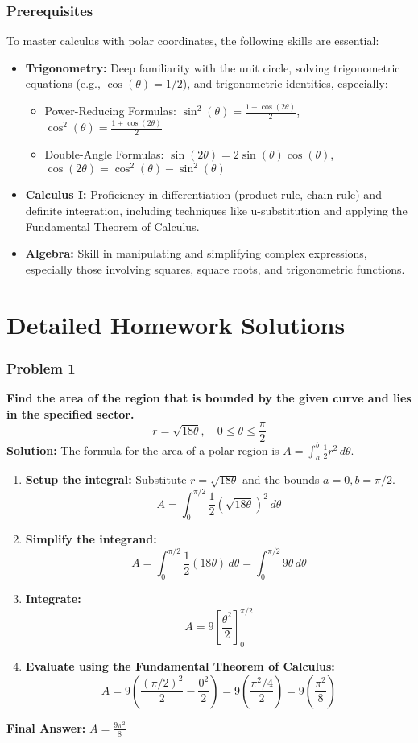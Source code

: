\documentclass{article}
\begin{document}
\section{Prerequisites}
To master calculus with polar coordinates, the following skills are essential:
\begin{itemize}
    \item \textbf{Trigonometry:} Deep familiarity with the unit circle, solving trigonometric equations (e.g., $\cos(\theta) = 1/2$), and trigonometric identities, especially:
    \begin{itemize}
        \item Power-Reducing Formulas: $\sin^2(\theta) = \frac{1 - \cos(2\theta)}{2}$, $\cos^2(\theta) = \frac{1 + \cos(2\theta)}{2}$
        \item Double-Angle Formulas: $\sin(2\theta) = 2\sin(\theta)\cos(\theta)$, $\cos(2\theta) = \cos^2(\theta) - \sin^2(\theta)$
    \end{itemize}
    \item \textbf{Calculus I:} Proficiency in differentiation (product rule, chain rule) and definite integration, including techniques like u-substitution and applying the Fundamental Theorem of Calculus.
    \item \textbf{Algebra:} Skill in manipulating and simplifying complex expressions, especially those involving squares, square roots, and trigonometric functions.
\end{itemize}

\part{Detailed Homework Solutions}
\newpage
\section*{Problem 1}
\textbf{Find the area of the region that is bounded by the given curve and lies in the specified sector.}
\[ r = \sqrt{18\theta}, \quad 0 \le \theta \le \frac{\pi}{2} \]
\textbf{Solution:}
The formula for the area of a polar region is $A = \int_{a}^{b} \frac{1}{2} r^2 \,d\theta$.
\begin{enumerate}
    \item \textbf{Setup the integral:}
    Substitute $r = \sqrt{18\theta}$ and the bounds $a=0, b=\pi/2$.
    \[ A = \int_{0}^{\pi/2} \frac{1}{2} (\sqrt{18\theta})^2 \,d\theta \]
    \item \textbf{Simplify the integrand:}
    \[ A = \int_{0}^{\pi/2} \frac{1}{2} (18\theta) \,d\theta = \int_{0}^{\pi/2} 9\theta \,d\theta \]
    \item \textbf{Integrate:}
    \[ A = 9 \left[ \frac{\theta^2}{2} \right]_{0}^{\pi/2} \]
    \item \textbf{Evaluate using the Fundamental Theorem of Calculus:}
    \[ A = 9 \left( \frac{(\pi/2)^2}{2} - \frac{0^2}{2} \right) = 9 \left( \frac{\pi^2/4}{2} \right) = 9 \left( \frac{\pi^2}{8} \right) \]
\end{enumerate}
\textbf{Final Answer:} $A = \frac{9\pi^2}{8}$
\end{document}
